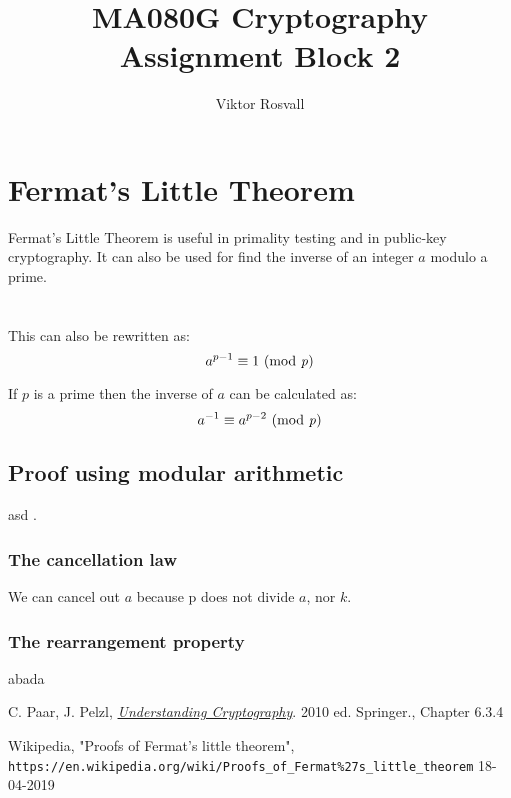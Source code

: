 \documentclass{article}
\title{MA080G Cryptography Assignment Block 2}
\author{Viktor Rosvall}
\begin{document}
	\maketitle
	
	\section*{Fermat's Little Theorem} 
	Fermat's Little Theorem is useful in primality testing and in public-key cryptography. It can also be used for find the inverse of  an integer $a$ modulo a prime. \cite{fermatsummary}
	\\
	\\
	\\

	This can also be rewritten as: 
	$$
	a^{p-1} \equiv 1 \text{ (mod \textit{p})}
	$$
	
	If $p$ is a prime then the inverse of $a$ can be calculated as:
	$$
	a^{-1} \equiv a^{p-2} \text{ (mod \textit{p})}
	$$
	
 	\subsection*{Proof using modular arithmetic \cite{fermatproof}}
 	asd . 
 	
 	
 	\subsubsection*{The cancellation law}
 	We can cancel out $a$ because p does not divide $a$, nor $k$.
 	
 	\subsubsection*{The rearrangement property}
 	abada

	\newpage

	\begin{thebibliography}{99}
		
		C. Paar, J. Pelzl, 
		\textit{\underline{Understanding Cryptography}}. 2010 ed.
		Springer., Chapter 6.3.4 
		
		Wikipedia, "Proofs of Fermat's little theorem",
		\\\texttt{https://en.wikipedia.org/wiki/Proofs\_of\_Fermat\%27s\_little\_theorem} 18-04-2019
		
	\end{thebibliography}
\end{document}
